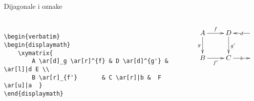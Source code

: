 \begin{frame}{Dijagonale i oznake}
\begin{columns}[c]
\begin{column}{0.5\textwidth}
\begin{Verbatim}[fontsize=\tiny]

\begin{verbatim}
\begin{displaymath}
    \xymatrix{
        A \ar[d]_g \ar[r]^{f} & D \ar[d]^{g'} & \ar[l]|d E \\
        B \ar[r]_{f'}       & C \ar[r]|b &  F \ar[u]|a  }
\end{displaymath}
\end{Verbatim}

\end{column}

\begin{column}{0.5\textwidth}%

\begin{displaymath}
    \xymatrix{
        A \ar[d]_g \ar[r]^{f} & D \ar[d]^{g'} & \ar[l]|d E \\
        B \ar[r]_{f'}       & C \ar[r]|b &  F \ar[u]|a }
\end{displaymath}

\end{column}

\end{columns}

\end{frame}

